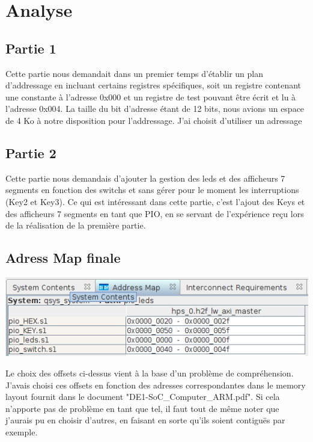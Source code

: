 \section{Analyse}

\subsection{Partie 1}
Cette partie nous demandait dans un premier temps d'établir un plan d'addressage en incluant certains registres spécifiques, soit un registre contenant une constante à l'adresse 0x000 et un registre de test pouvant être écrit et lu à l'adresse 0x004. La taille du bit d'adresse étant de 12 bits, nous avions un espace de 4 Ko à notre disposition pour l'addressage. J'ai choisit d'utiliser un adressage 
\subsection{Partie 2}
Cette partie nous demandais d'ajouter la gestion des leds et des afficheurs 7 segments en fonction des switchs et sans gérer pour le moment les interruptions (Key2 et Key3). Ce qui est intéressant dans cette partie, c'est l'ajout des Keys et des afficheurs 7 segments en tant que PIO, en se servant de l'expérience reçu lors de la réalisation de la première partie.


\subsection{Adress Map finale}

\includegraphics[scale=0.6]{./images/address_map.png}
\par
Le choix des offsets ci-dessus vient à la base d'un problème de compréhension. J'avais choisi ces offsets en fonction des adresses correspondantes dans le memory layout fournit dans le document "DE1-SoC\_Computer\_ARM.pdf". Si cela n'apporte pas de problème en tant que tel, il faut tout de même noter que j'aurais pu en choisir d'autres, en faisant en sorte qu'ils soient contiguës par exemple.

